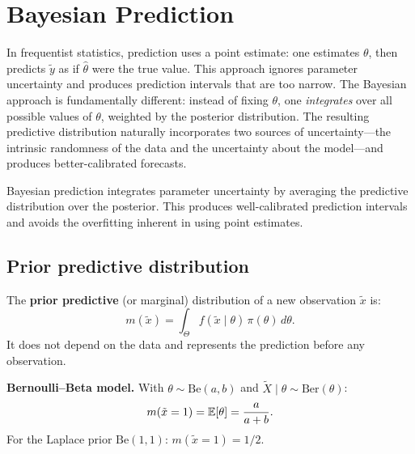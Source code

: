 \chapter{Bayesian Prediction}
\label{ch:prediction}

In frequentist statistics, prediction uses a point estimate: one estimates $\theta$, then predicts $\tilde{y}$ as if $\hat\theta$ were the true value. This approach ignores parameter uncertainty and produces prediction intervals that are too narrow. The Bayesian approach is fundamentally different: instead of fixing $\theta$, one \emph{integrates} over all possible values of $\theta$, weighted by the posterior distribution. The resulting predictive distribution naturally incorporates two sources of uncertainty---the intrinsic randomness of the data and the uncertainty about the model---and produces better-calibrated forecasts.

\begin{intuition}[title=\textbf{Central idea}]
Bayesian prediction integrates parameter uncertainty by averaging the
predictive distribution over the posterior. This produces well-calibrated
prediction intervals and avoids the overfitting inherent in using point
estimates.
\end{intuition}

\section{Prior predictive distribution}

\begin{definition}
The \textbf{prior predictive} (or marginal) distribution of a new
observation $\tilde{x}$ is:
\[
  m(\tilde{x}) = \int_\Theta f(\tilde{x} \mid \theta)\,\pi(\theta)\,d\theta.
\]
It does not depend on the data and represents the prediction before any
observation.
\end{definition}

\begin{example}
\textbf{Bernoulli--Beta model.}
With $\theta \sim \text{Be}(a, b)$ and
$\tilde{X} \mid \theta \sim \text{Ber}(\theta)$:
\[
  m(\tilde{x} = 1) = \mathbb{E}[\theta] = \frac{a}{a + b}.
\]
For the Laplace prior $\text{Be}(1, 1)$: $m(\tilde{x} = 1) = 1/2$.
\end{example}

